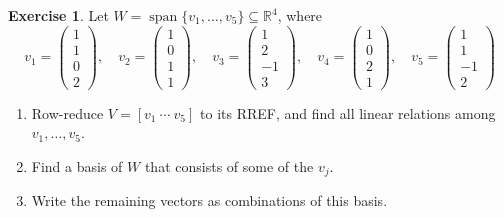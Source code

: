 \documentclass[12pt]{article}
\newcommand{\R}{\mathbb R}
\DeclareMathOperator{\Span}{span}
\theoremstyle{definition}
\newtheorem{exercise}{Exercise}
\begin{document}
\begin{exercise}\label{r3-dr-basis-of-span}
Let \(W=\Span\{v_1,\dots,v_5\}\subseteq\R^4\), where
\[
v_1=\begin{pmatrix}1\\1\\0\\2\end{pmatrix},\quad v_2=\begin{pmatrix}1\\0\\1\\1\end{pmatrix},\quad
v_3=\begin{pmatrix}1\\2\\-1\\3\end{pmatrix},\quad v_4=\begin{pmatrix}1\\0\\2\\1\end{pmatrix},\quad
v_5=\begin{pmatrix}1\\1\\-1\\2\end{pmatrix}
\]
\begin{enumerate}
\item Row-reduce \(V=[v_1\ \cdots\ v_5]\) to its RREF, and find all linear relations among
\(v_1,\dots,v_5\).
\item Find a basis of \(W\) that consists of some of the \(v_j\).
\item Write the remaining vectors as combinations of this basis.
\end{enumerate}
\end{exercise}
\end{document}
